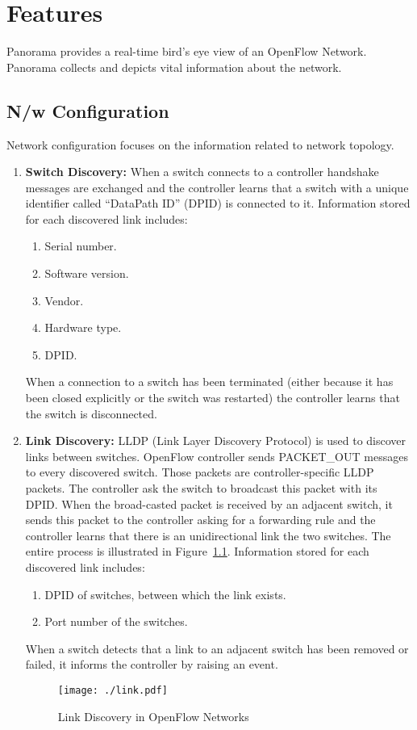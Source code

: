 \documentclass[11pt,a4paper]{report}
\begin{document}
	\chapter{Features}
	Panorama provides a real-time bird's eye view of an OpenFlow Network. Panorama collects and depicts vital information about the network. 
	\section{N/w Configuration}
	Network configuration focuses on the information related to network topology.
	\begin{enumerate}
		\item \textbf{Switch Discovery:} When a switch connects to a controller handshake messages are exchanged and the controller learns that a switch with a unique identifier called ``DataPath ID'' (DPID) is connected to it. Information stored for each discovered link includes:
		\begin{enumerate}
			\item Serial number.
			\item Software version.
			\item Vendor.
			\item Hardware type.
			\item DPID.
		\end{enumerate}
		When a connection to a switch has been terminated (either because it has been closed explicitly or the switch was restarted) the controller learns that the switch is disconnected.
				
		\item \textbf{Link Discovery:} LLDP (Link Layer Discovery Protocol) is used to discover links between switches. OpenFlow controller sends PACKET\_OUT messages to every discovered switch. Those packets are controller-specific LLDP packets. The controller ask the switch to broadcast this packet with its DPID. When the broad-casted packet is received by an adjacent switch, it sends this packet to the controller asking for a forwarding rule and the controller learns that there is an unidirectional link the two switches.  The entire process is illustrated in Figure~\ref{link}. Information stored for each discovered link includes:
		\begin{enumerate}
			\item DPID of switches, between which the link exists.
			\item Port number of the switches.
		\end{enumerate}
		When a switch detects that a link to an adjacent switch has been removed or failed, it informs the controller by raising an event.
			\begin{figure}[!htbp]
				\centering
				\texttt{[image: ./link.pdf]}
				\caption{Link Discovery in OpenFlow Networks}
				\label{link}
			\end{figure}
			

\end{enumerate}
\end{document}
